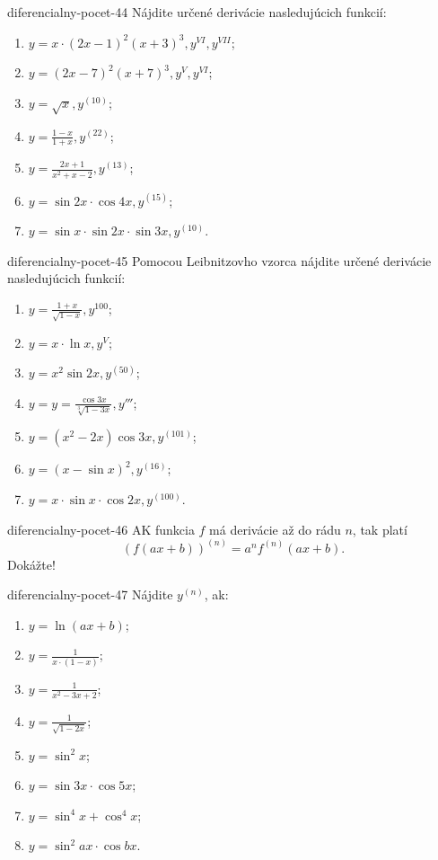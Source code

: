 \begin{defproblem}{diferencialny-pocet-44}
Nájdite určené derivácie nasledujúcich funkcií:
\begin{enumerate}
\item $y=x\cdot (2x-1)^2(x+3)^3,y^{VI},y^{VII}$;
\item $y=(2x-7)^2(x+7)^3,y^{V},y^{VI}$;
\item $y=\sqrt{x},y^{(10)}$;
\item $y=\frac{1-x}{1+x},y^{(22)}$;
\item $y=\frac{2x+1}{x^2+x-2},y^{(13)}$;
\item $y=\sin 2x\cdot\cos 4x,y^{(15)}$;
\item $y=\sin x\cdot \sin 2x \cdot \sin 3x,y^{(10)}$.
\end{enumerate}
\end{defproblem}

\begin{defproblem}{diferencialny-pocet-45}
Pomocou Leibnitzovho vzorca nájdite určené derivácie nasledujúcich funkcií:
\begin{enumerate}
\item $y=\frac{1+x}{\sqrt{1-x}},y^{100}$;
\item $y=x\cdot\ln x,y^{V}$;
\item $y=x^2\sin 2x,y^{(50)}$;
\item $y=y=\frac{\cos 3x}{\sqrt[3]{1-3x}},y'''$;
\item $y=(x^2-2x)\cos 3x,y^{(101)}$;
\item $y=(x-\sin x)^2,y^{(16)}$;
\item $y=x\cdot\sin x\cdot\cos 2x,y^{(100)}$.
\end{enumerate}
\end{defproblem}

\begin{defproblem}{diferencialny-pocet-46}
AK funkcia $f$ má derivácie až do rádu $n$, tak platí
$$(f(ax+b))^{(n)}=a^nf^{(n)}(ax+b).$$ Dokážte!
\end{defproblem}

\begin{defproblem}{diferencialny-pocet-47}
Nájdite $y^{(n)}$, ak:
\begin{multicols}{2}
\begin{enumerate}
    \item $y=\ln (ax+b)$;
    \item $y=\frac{1}{x\cdot(1-x)}$;
    \item $y=\frac{1}{x^2-3x+2}$;
    \item $y=\frac{1}{\sqrt{1-2x}}$;
    \item $y=\sin^2 x$;
    \item $y=\sin3x \cdot \cos 5x$;
    \item $y=\sin^4 x+\cos^4 x$;
    \item $y=\sin^2 ax \cdot \cos bx$.
\end{enumerate}
\end{multicols}
\end{defproblem}

